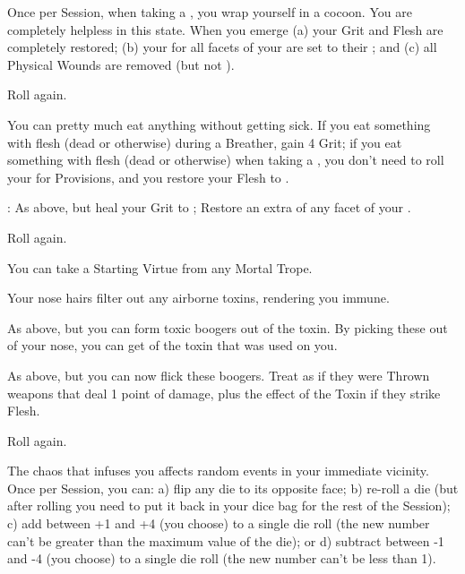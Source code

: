 \begin{multicols*}{2}
 Once per Session, when taking a , you wrap yourself in a cocoon.  You are completely helpless in this state.  When you emerge (a) your Grit and Flesh are completely restored; (b) your \UD for all facets of your  are set to their \MAX; and (c) all Physical Wounds are removed (but not ).

 Roll again.



\NC[Name=Meat on Menu]

 You can pretty much eat anything without getting sick.  If you eat something with flesh (dead or otherwise) during a Breather, gain 4 Grit; if you eat something with flesh (dead or otherwise) when taking a , you don't need to roll your \UD for Provisions, and you restore your Flesh to \MAX.

  : As above, but heal your Grit to \MAX;  Restore an extra \UD of any  facet of your .

  Roll again.

\NC[Name=Me Human!]

 You can take a Starting Virtue from any Mortal Trope.


\NC[Name=Nose Hairs]

  Your nose hairs filter out any airborne toxins, rendering you immune.

  As above, but you can form toxic boogers out of the toxin.  By picking these out of your nose, you can get  of the toxin that was used on you.

  As above, but you can now flick these boogers.  Treat as if they were Thrown weapons that deal 1 point of damage, plus the effect of the Toxin if they strike Flesh.

  Roll again.

\NC[Name=Rando]

 The chaos that infuses you affects random events in your immediate vicinity.  Once per Session, you can:  a) flip any die to its opposite face; b) re-roll a die (but after rolling you need to put it back in your dice bag for the rest of the Session); c) add between +1 and +4 (you choose) to a single die roll (the new number can't be greater than the maximum value of the die); or d) subtract between -1 and -4 (you choose) to a single die roll (the new number can't be less than 1).


\end{multicols*}
